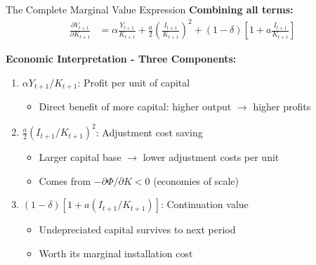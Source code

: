 \documentclass{beamer}
\begin{document}
\begin{frame}{The Complete Marginal Value Expression}
    \textbf{Combining all terms:}
    \begin{equation}\label{equ:marginal value}
        \boxed{
        \begin{aligned}
            \frac{\partial V_{t+1}}{\partial K_{t+1}} &= \alpha \frac{Y_{t+1}}{K_{t+1}} + \frac{a}{2}\left(\frac{I_{t+1}}{K_{t+1}}\right)^2 + (1-\delta)\left[1 + a\frac{I_{t+1}}{K_{t+1}}\right]
        \end{aligned}
        }
    \end{equation}
    
    
    \textbf{Economic Interpretation - Three Components:}
    \begin{enumerate}
        \item $\alpha Y_{t+1}/K_{t+1}$: Profit per unit of capital
        \begin{itemize}
            \item Direct benefit of more capital: higher output $\rightarrow$ higher profits
        \end{itemize}
        
        \item $\frac{a}{2}(I_{t+1}/K_{t+1})^2$: Adjustment cost saving
        \begin{itemize}
            \item Larger capital base $\rightarrow$ lower adjustment costs per unit
            \item Comes from $-\partial \Phi/\partial K < 0$ (economies of scale)
        \end{itemize}
        
        \item $(1-\delta)[1 + a(I_{t+1}/K_{t+1})]$: Continuation value
        \begin{itemize}
            \item Undepreciated capital survives to next period
            \item Worth its marginal installation cost
        \end{itemize}
    \end{enumerate}
\end{frame}
\end{document}
